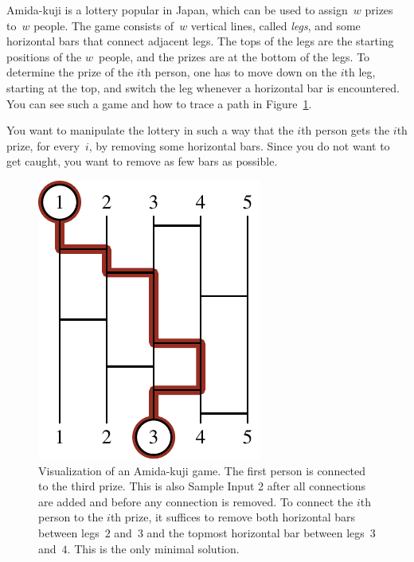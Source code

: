 
%
Amida-kuji is a lottery popular in Japan, which can be used to assign~$w$ prizes to~$w$ people.
The game consists of~$w$ vertical lines, called \emph{legs}, and some horizontal bars that connect adjacent legs.
The tops of the legs are the starting positions of the $w$~people, and the prizes are at the bottom of the legs.
To determine the prize of the $i$th person, one has to move down on the $i$th leg, starting at the top, and switch the leg whenever a horizontal bar is encountered.
You can see such a game and how to trace a path in Figure~\ref{fig:amidakuji}.

You want to manipulate the lottery in such a way that the $i$th person gets the $i$th prize,
for every~$i$, by removing some horizontal bars.
Since you do not want to get caught, you want to remove as few bars as possible.

\begin{figure}[h]
	\centering
	\includegraphics{sample}
	\caption{Visualization of an Amida-kuji game. 
		The first person is connected to the third prize.
		This is also Sample Input 2 after all connections are added and before any connection is removed.
		To connect the $i$th person to the $i$th prize, it suffices to remove both horizontal bars between legs~$2$ and~$3$ and the topmost horizontal bar between legs~$3$ and~$4$.
		This is the only minimal solution.}\label{fig:amidakuji}
\end{figure}

